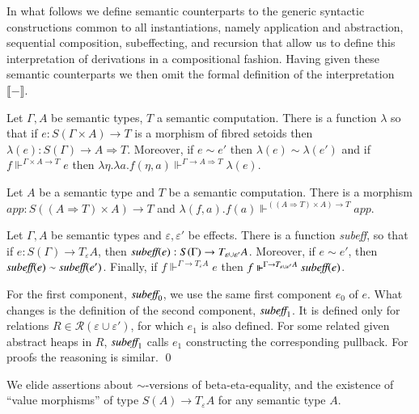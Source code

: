\documentclass[orivec]{llncs}
\newcommand{\eff}{\varepsilon}
\newcommand{\sem}[1]{\ensuremath{\llbracket {#1} \rrbracket}}
\renewenvironment{proof}{\vspace{-1mm} \noindent {\bf Proof}\quad}{\qed}
\newcommand\Rscr{\ensuremath{\mathcal{R}}\xspace}
\begin{document}
In what follows we define semantic counterparts to the generic
syntactic constructions common to all instantiations, namely
application and abstraction, sequential composition, subeffecting, and
recursion
that allow us to define this interpretation of derivations in a
compositional fashion. Having given these semantic counterparts we
then omit the formal definition of the interpretation $\sem{-}$.
\begin{lemma}[Abstraction]
Let $\Gamma,A$ be  semantic types, $T$ a semantic computation. There is a function $\lambda$ so that if $e:S(\Gamma\times A)\rightarrow T$ is a morphism of fibred setoids then $\lambda(e):S(\Gamma)\rightarrow A{\Rightarrow}T$. Moreover, if $e\sim e'$ then $\lambda(e)\sim\lambda(e')$ and if $f\Vdash^{\Gamma\times A\rightarrow T} e$ then $\lambda\eta.\lambda a.f(\eta,a)\Vdash^{\Gamma\rightarrow A{\Rightarrow}T} \lambda(e)$. 
\end{lemma}
\begin{lemma}[Application]
Let $A$ be a semantic type and $T$ be a semantic computation. There  is a
morphism $\textit{app} : S((A{\Rightarrow}T)\times A)\rightarrow T$ and
$\lambda (f,a).f(a)\Vdash^{((A{\Rightarrow}T)\times A)\rightarrow T}
\textit{app}$.  
\end{lemma}

\begin{lemma}[subeffecting]
 Let $\Gamma, A$ be semantic types and $\eff, \eff'$ be effects. There is
a function \emph{subeff}, so that if $e: S(\Gamma) \to T_\eff A$, then 
$\emph{subeff}(e) : S(\Gamma) \to T_{\eff \cup \eff'} A$. Moreover, if $e
\sim e'$, then $\emph{subeff}(e) \sim \emph{subeff}(e')$. Finally, if $f
\Vdash^{\Gamma \to T_\eff A} e$ then $f \Vdash^{\Gamma \to T_{\eff \cup
\eff'} A} \emph{subeff}(e)$.
\end{lemma}

\begin{proof}
For the first component, $\emph{subeff}_0$, we use the same first component
$e_0$ of  $e$. What changes is the definition of the second
component, $\emph{subeff}_1$. It is defined only for relations $R \in
\Rscr(\eff \cup \eff')$, for which $e_1$ is also defined. For some related
given abstract heaps in $R$, $\emph{subeff}_1$ calls $e_1$ constructing the
corresponding pullback. For proofs the reasoning is similar.
\end{proof}


We elide assertions about $\sim$-versions of beta-eta-equality, and
the existence of ``value morphisms'' of type
$S(A)\rightarrow T_\eff A$ for any semantic type $A$. 
\end{document}
